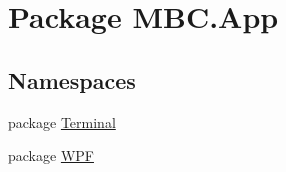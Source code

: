 \hypertarget{namespace_m_b_c_1_1_app}{\section{Package M\-B\-C.\-App}
\label{namespace_m_b_c_1_1_app}
}
\subsection*{Namespaces}
\begin{DoxyCompactItemize}
\item 
package \hyperlink{namespace_m_b_c_1_1_app_1_1_terminal}{Terminal}
\item 
package \hyperlink{namespace_m_b_c_1_1_app_1_1_w_p_f}{W\-P\-F}
\end{DoxyCompactItemize}
